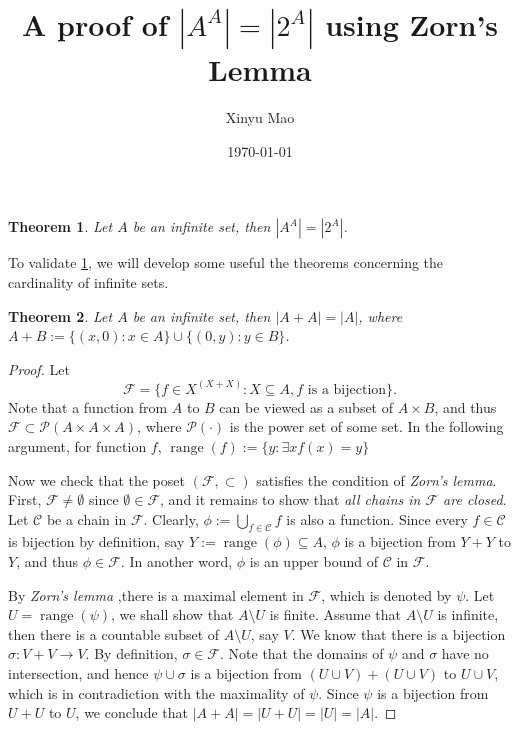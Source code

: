 \documentclass[12pt]{article}
\title{A proof of $|A^A| = |2^A| $ using Zorn's Lemma}
\author{Xinyu Mao}
\date{\today}
\theoremstyle{mythm}
\newtheorem{theorem}{Theorem}
\newcommand\cc{\mathcal{C}}
\newcommand\pp{\mathcal{P}}
\newcommand\ff{\mathcal{F}}
\DeclareMathOperator{\range}{range}
\begin{document}
\maketitle

\begin{tcolorbox}
\begin{theorem} \label{main}
    Let $A$ be an infinite set, then $|A^A| = |2^A|$.
\end{theorem}
\end{tcolorbox}
To validate \cref{main}, we will develop some useful the theorems concerning 
the cardinality of infinite sets.

\begin{theorem} \label{helper1}
    Let $A$ be an infinite set, then $|A + A| = |A|$,
    where $A + B := \{(x,0):x \in A\} \cup \{(0,y) : y \in B\}$.
\end{theorem}  

\begin{proof}
    Let 
    $$
    \ff = \{f \in X^{(X + X)} : X \subseteq A, f \text{ is a bijection}\}.
    $$
    Note that a function from $A$ to $B$ can be viewed as 
    a subset of $A \times B$, and thus $\ff \subset \pp(A \times A \times A)$,
    where $\pp(\cdot)$ is the power set of some set. 
    In the following argument, for function $f$, $\range(f) := \{y:\exists x f(x) = y\}$
    
    Now we check that the poset $(\ff, \subset)$ satisfies
    the condition of \textit{Zorn's lemma}. 
    First, $\ff \neq \emptyset$ since $\emptyset \in \ff$,
    and it remains to show that \textit{all chains in $\ff$ are closed}.
    Let $\cc$ be a chain in $\ff$. 
    Clearly, $\phi := \bigcup_{f \in \cc} f$ is also a
    function. Since every $f \in \cc$ is bijection by definition, 
    say $Y := \range(\phi) \subseteq A$, $\phi$ is a bijection from $Y + Y$ to $Y$,
    and thus $\phi \in \ff$.
    In another word, $\phi$ is an upper bound of $\cc$ in $\ff$. 

    By \textit{Zorn's lemma} ,there is a maximal element in $\ff$,
    which is denoted by $\psi$. Let $U = \range(\psi)$, we shall
    show that $A\setminus U$ is finite. Assume that $A\setminus U$
    is infinite, then there is a countable subset of $A\setminus U$,
    say $V$. We know that there is a bijection $\sigma : V + V \to V$.
    By definition, $\sigma \in \ff$. 
    Note that the domains of $\psi$ and $\sigma$ have no intersection, 
    and hence $\psi \cup \sigma$ is a bijection from $(U \cup V) + (U \cup V)$ to $U \cup V$, 
    which is in contradiction with the maximality of $\psi$.
    Since $\psi$ is a bijection from $U + U $ to $U$,
    we conclude that $|A + A| = |U + U| = |U| = |A|$.
\end{proof}     
\end{document}
